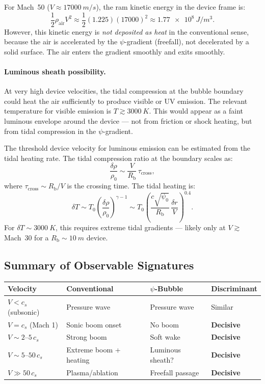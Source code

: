 \documentclass[12pt, letterpaper]{article}
\theoremstyle{definition}
\theoremstyle{remark}
\newcommand{\Rbub}{R_{\mathrm{b}}}
\newcommand{\cs}{c_s}
\begin{document}
For Mach~50 ($V \approx \SI{17000}{m/s}$), the ram kinetic energy in the
device frame is:
\begin{equation}
\frac{1}{2}\rho_{\mathrm{air}} V^2 \approx \frac{1}{2}(1.225)(17000)^2
\approx \SI{1.77e8}{J/m^3}.
\end{equation}
However, this kinetic energy is \emph{not deposited as heat} in the
conventional sense, because the air is accelerated by the $\psi$-gradient
(freefall), not decelerated by a solid surface. The air enters the gradient
smoothly and exits smoothly.

\paragraph{Luminous sheath possibility.}
At very high device velocities, the tidal compression at the bubble boundary
could heat the air sufficiently to produce visible or UV emission. The
relevant temperature for visible emission is $T \gtrsim \SI{3000}{K}$.
This would appear as a faint luminous envelope around the device ---
not from friction or shock heating, but from tidal compression in the
$\psi$-gradient.

The threshold device velocity for luminous emission can be estimated from the
tidal heating rate. The tidal compression ratio at the boundary scales as:
\begin{equation}
\frac{\delta\rho}{\rho_0} \sim \frac{V}{\Rbub}\,\tau_{\mathrm{cross}},
\end{equation}
where $\tau_{\mathrm{cross}} \sim \Rbub / V$ is the crossing time. The tidal
heating is:
\begin{equation}
\delta T \sim T_0 \left(\frac{\delta\rho}{\rho_0}\right)^{\gamma - 1}
\sim T_0 \left(\frac{c\sqrt{\psi_0}}{\Rbub}\,\frac{\delta r}{V}\right)^{0.4}.
\end{equation}
For $\delta T \sim \SI{3000}{K}$, this requires extreme tidal gradients ---
likely only at $V \gtrsim$ Mach~30 for a $\Rbub \sim \SI{10}{m}$ device.

\subsection{Summary of Observable Signatures}

\begin{center}
\begin{tabular}{llll}
\toprule
\textbf{Velocity} & \textbf{Conventional} & \textbf{$\psi$-Bubble} & \textbf{Discriminant} \\
\midrule
$V < \cs$ (subsonic) & Pressure wave & Pressure wave & Similar \\
$V = \cs$ (Mach 1) & Sonic boom onset & No boom & \textbf{Decisive} \\
$V \sim 2\text{--}5\,\cs$ & Strong boom & Soft wake & \textbf{Decisive} \\
$V \sim 5\text{--}50\,\cs$ & Extreme boom + heating & Luminous sheath? & \textbf{Decisive} \\
$V \gg 50\,\cs$ & Plasma/ablation & Freefall passage & \textbf{Decisive} \\
\bottomrule
\end{tabular}
\end{center}
\end{document}
